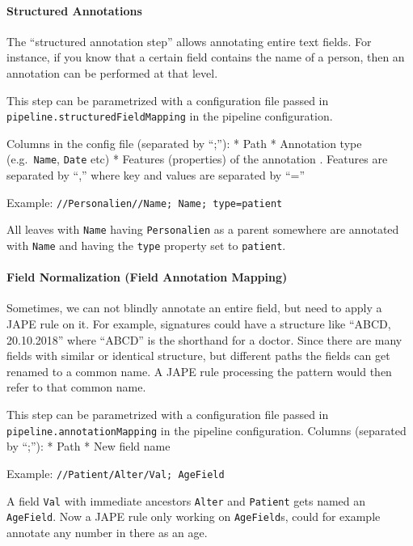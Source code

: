 \paragraph{Structured Annotations}\label{structured-annotations}

The ``structured annotation step'' allows annotating entire text fields.
For instance, if you know that a certain field contains the name of a
person, then an annotation can be performed at that level.

This step can be parametrized with a configuration file passed in
\texttt{pipeline.structuredFieldMapping} in the pipeline configuration.

Columns in the config file (separated by ``;''): * Path * Annotation
type (e.g.~\texttt{Name}, \texttt{Date} etc) * Features (properties) of
the annotation . Features are separated by ``,'' where key and values
are separated by ``=''

Example: \texttt{//Personalien//Name;\ Name;\ type=patient}

All leaves with \texttt{Name} having \texttt{Personalien} as a parent
somewhere are annotated with \texttt{Name} and having the \texttt{type}
property set to \texttt{patient}.

\paragraph{Field Normalization (Field Annotation
Mapping)}\label{field-normalization-field-annotation-mapping}

Sometimes, we can not blindly annotate an entire field, but need to
apply a JAPE rule on it. For example, signatures could have a structure
like ``ABCD, 20.10.2018'' where ``ABCD'' is the shorthand for a doctor.
Since there are many fields with similar or identical structure, but
different paths the fields can get renamed to a common name. A JAPE rule
processing the pattern would then refer to that common name.

This step can be parametrized with a configuration file passed in
\texttt{pipeline.annotationMapping} in the pipeline configuration.
Columns (separated by ``;''): * Path * New field name

Example: \texttt{//Patient/Alter/Val;\ AgeField}

A field \texttt{Val} with immediate ancestors \texttt{Alter} and
\texttt{Patient} gets named an \texttt{AgeField}. Now a JAPE rule only
working on \texttt{AgeField}s, could for example annotate any number in
there as an age.

